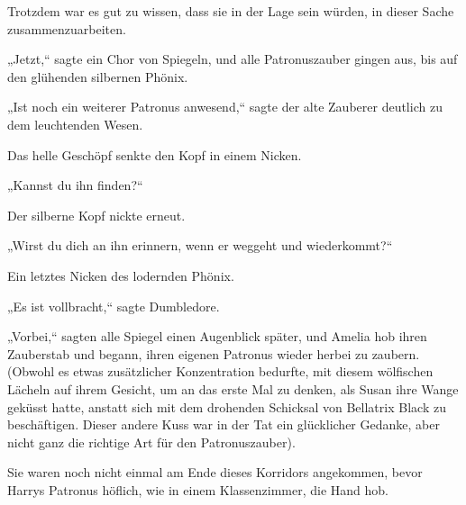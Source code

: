 Trotzdem war es gut zu wissen, dass sie in der Lage sein würden, in dieser Sache zusammenzuarbeiten.

„Jetzt,“ sagte ein Chor von Spiegeln, und alle Patronuszauber gingen aus, bis auf den glühenden silbernen Phönix.

„Ist noch ein weiterer Patronus anwesend,“ sagte der alte Zauberer deutlich zu dem leuchtenden Wesen.

Das helle Geschöpf senkte den Kopf in einem Nicken.

„Kannst du ihn finden?“

Der silberne Kopf nickte erneut.

„Wirst du dich an ihn erinnern, wenn er weggeht und wiederkommt?“

Ein letztes Nicken des lodernden Phönix.

„Es ist vollbracht,“ sagte Dumbledore.

„Vorbei,“ sagten alle Spiegel einen Augenblick später, und Amelia hob ihren Zauberstab und begann, ihren eigenen Patronus wieder herbei zu zaubern. (Obwohl es etwas zusätzlicher Konzentration bedurfte, mit diesem wölfischen Lächeln auf ihrem Gesicht, um an das erste Mal zu denken, als Susan ihre Wange geküsst hatte, anstatt sich mit dem drohenden Schicksal von Bellatrix Black zu beschäftigen. Dieser andere Kuss war in der Tat ein glücklicher Gedanke, aber nicht ganz die richtige Art für den Patronuszauber).

\later

Sie waren noch nicht einmal am Ende dieses Korridors angekommen, bevor Harrys Patronus höflich, wie in einem Klassenzimmer, die Hand hob.

